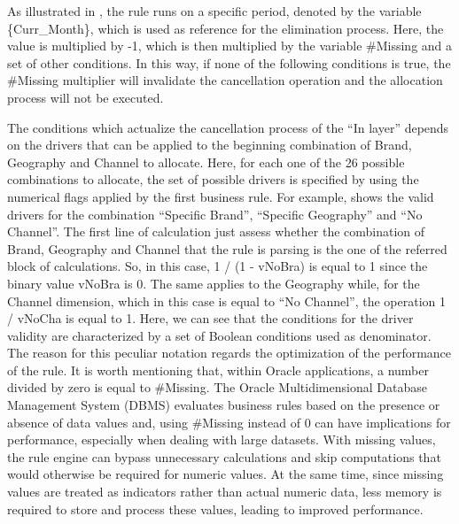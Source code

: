 \documentclass[12pt,a4paper,openright,twoside]{book}
\begin{document}


As illustrated in , the rule runs on a specific period, denoted by the variable \{Curr\_Month\}, which is used as reference for the elimination process.
%
Here, the value is multiplied by -1, which is then multiplied by the variable \#Missing and a set of other conditions.
%
In this way, if none of the following conditions is true, the \#Missing multiplier will invalidate the cancellation operation and the allocation process will not be executed.



The conditions which actualize the cancellation process of the ``In layer'' depends on the drivers that can be applied to the beginning combination of Brand, Geography and Channel to allocate.
%
Here, for each one of the 26 possible combinations to allocate, the set of possible drivers is specified by using the numerical flags applied by the first business rule.
%
For example,  shows the valid drivers for the combination ``Specific Brand'', ``Specific Geography'' and ``No Channel''.
%
The first line of calculation just assess whether the combination of Brand, Geography and Channel that the rule is parsing is the one of the referred block of calculations.
%
So, in this case, 1 / (1 - vNoBra) is equal to 1 since the binary value vNoBra is 0.
%
The same applies to the Geography while, for the Channel dimension, which in this case is equal to ``No Channel'', the operation 1 / vNoCha is equal to 1.
%
Here, we can see that the conditions for the driver validity are characterized by a set of Boolean conditions used as denominator.
%
The reason for this peculiar notation regards the optimization of the performance of the rule.
%
It is worth mentioning that, within Oracle applications, a number divided by zero is equal to \#Missing.
%
The Oracle Multidimensional Database Management System (DBMS) evaluates business rules based on the presence or absence of data values and, using \#Missing instead of 0 can have implications for performance, especially when dealing with large datasets. 
%
With missing values, the rule engine can bypass unnecessary calculations and skip computations that would otherwise be required for numeric values.
%
At the same time, since missing values are treated as indicators rather than actual numeric data, less memory is required to store and process these values, leading to improved performance.
\end{document}
